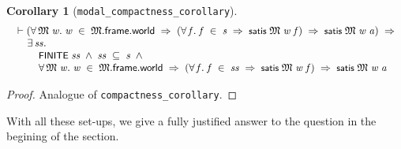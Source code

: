 \documentclass[letterpaper]{article}
\newtheorem{coro}{Corollary}
\renewcommand{\HOLConst}[1]{{\textsf{\upshape\small #1}}}
\newenvironment{holmath}{\begin{displaymath}\begin{array}{l}}{\end{array}\end{displaymath}\ignorespacesafterend}
\begin{document}
\begin{coro}[\texttt{modal_compactness_corollary}]
\begin{holmath}
  \ensuremath{\HOLTokenTurnstile}(\HOLSymConst{\HOLTokenForall{}}\HOLBoundVar{\ensuremath{\mathfrak{M}}}\;\HOLBoundVar{w}.\;\HOLBoundVar{w}\;\HOLSymConst{\HOLTokenIn{}}\;\HOLBoundVar{\ensuremath{\mathfrak{M}}}.\HOLFieldName{frame}.\HOLFieldName{world}\;\HOLSymConst{\HOLTokenImp{}}\;(\HOLSymConst{\HOLTokenForall{}}\HOLBoundVar{f}.\;\HOLBoundVar{f}\;\HOLSymConst{\HOLTokenIn{}}\;\HOLFreeVar{s}\;\HOLSymConst{\HOLTokenImp{}}\;\HOLConst{satis}\;\HOLBoundVar{\ensuremath{\mathfrak{M}}}\;\HOLBoundVar{w}\;\HOLBoundVar{f})\;\HOLSymConst{\HOLTokenImp{}}\;\HOLConst{satis}\;\HOLBoundVar{\ensuremath{\mathfrak{M}}}\;\HOLBoundVar{w}\;\HOLFreeVar{a})\;\HOLSymConst{\HOLTokenImp{}}\\
\;\;\;\;\;\HOLSymConst{\HOLTokenExists{}}\HOLBoundVar{ss}.\\
\;\;\;\;\;\;\;\;\;\HOLConst{FINITE}\;\HOLBoundVar{ss}\;\HOLSymConst{\HOLTokenConj{}}\;\HOLBoundVar{ss}\;\HOLSymConst{\HOLTokenSubset{}}\;\HOLFreeVar{s}\;\HOLSymConst{\HOLTokenConj{}}\\
\;\;\;\;\;\;\;\;\;\HOLSymConst{\HOLTokenForall{}}\HOLBoundVar{\ensuremath{\mathfrak{M}}}\;\HOLBoundVar{w}.\;\HOLBoundVar{w}\;\HOLSymConst{\HOLTokenIn{}}\;\HOLBoundVar{\ensuremath{\mathfrak{M}}}.\HOLFieldName{frame}.\HOLFieldName{world}\;\HOLSymConst{\HOLTokenImp{}}\;(\HOLSymConst{\HOLTokenForall{}}\HOLBoundVar{f}.\;\HOLBoundVar{f}\;\HOLSymConst{\HOLTokenIn{}}\;\HOLBoundVar{ss}\;\HOLSymConst{\HOLTokenImp{}}\;\HOLConst{satis}\;\HOLBoundVar{\ensuremath{\mathfrak{M}}}\;\HOLBoundVar{w}\;\HOLBoundVar{f})\;\HOLSymConst{\HOLTokenImp{}}\;\HOLConst{satis}\;\HOLBoundVar{\ensuremath{\mathfrak{M}}}\;\HOLBoundVar{w}\;\HOLFreeVar{a}
\end{holmath}
\end{coro}

\begin{proof}
 Analogue of \texttt{compactness_corollary}.
\end{proof}

With all these set-ups, we give a fully justified answer to the question in the begining of the section. 
\end{document}
